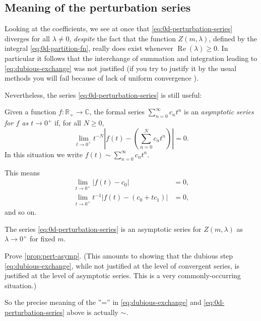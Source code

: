 \documentclass[12pt,letterpaper,reqno]{article}
\numberwithin{equation}{section}
\newcommand{\R}{\ensuremath{\mathbb R}}
\newcommand{\C}{\ensuremath{\mathbb C}}
\newcommand{\abs}[1]{\lvert#1\rvert}
\newcommand{\ti}[1]{\textit{#1}}
\DeclareMathOperator{\re}{Re}
\newcommand{\fixme}[1]{{\color{orange}{[#1]}}}
\begin{document}
\subsection{Meaning of the perturbation series}

Looking at the coefficients, we see at once that \eqref{eq:0d-perturbation-series} 
diverges for all $\lambda \neq 0$, \ti{despite} the fact that the function
$Z(m,\lambda)$, defined by the integral \eqref{eq:0d-partition-fn}, 
really does exist whenever $\re(\lambda) \ge 0$.
In particular it follows that the interchange of summation and integration leading to
\eqref{eq:dubious-exchange} was not justified (if you try to justify it by the usual methods you will fail
because of lack of uniform convergence \fixme{I think}).

Nevertheless, the series \eqref{eq:0d-perturbation-series} is still useful:
\begin{defn} 
Given a function $f: \R_+ \to \C$, 
the formal series $\sum_{n=0}^\infty c_n t^n$ is an \ti{asymptotic
series for $f$ as $t \to 0^+$} if, for all $N \ge 0$,
\begin{equation}
 \lim_{t \to 0^+} t^{-N} \left\lvert f(t) - \left( \sum_{n=0}^N c_n t^n \right) \right\rvert = 0. 
\end{equation}
In this situation we write $f(t) \sim \sum_{n=0}^\infty c_n t^n$.
\end{defn}
This means
\begin{align}
\lim_{t \to 0^+} \abs{f(t) - c_0} &= 0, \\
\lim_{t \to 0^+} t^{-1} \abs{f(t) - (c_0 + t c_1)} &= 0,
\end{align}
and so on.
\begin{prop} \label{prop:pert-asymp} The series \eqref{eq:0d-perturbation-series}
is an asymptotic series for $Z(m,\lambda)$ as $\lambda \to 0^+$ for fixed $m$.
\end{prop}

\begin{exercise} Prove \autoref{prop:pert-asymp}. (This amounts to showing that the dubious step
\eqref{eq:dubious-exchange}, while not justified at the level of convergent series, is justified
at the level of asymptotic series. This is a very commonly-occurring situation.)
\end{exercise}

So the precise meaning of the $\text{''=''}$ in \eqref{eq:dubious-exchange}
and \eqref{eq:0d-perturbation-series} above is actually $\sim$.
\end{document}
